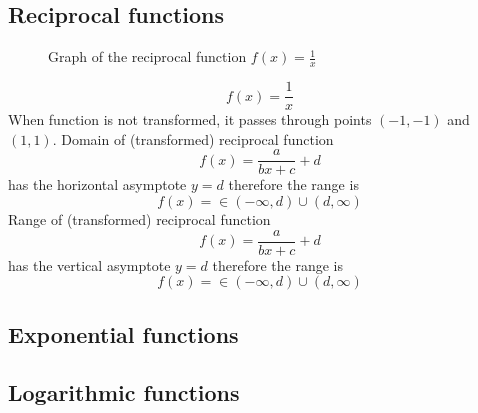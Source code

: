 \documentclass{article}
\begin{document}
\subsection{Reciprocal functions}

\begin{figure}
\centering
{}
\caption{Graph of the reciprocal function $f(x) = \frac{1}{x}$}
\end{figure}


\begin{equation}
  f(x) = \frac{1}{x}
\end{equation}
When function is not transformed, it passes through points $(-1, -1)$ and $(1, 1)$.
Domain of (transformed) reciprocal function
\begin{equation}
f(x) = \frac{a}{bx+c} + d
\end{equation}
has the horizontal asymptote $y = d$ therefore the range is
\begin{equation}
f(x) = \in (-\infty, d) \cup (d, \infty)
\end{equation}
Range of (transformed) reciprocal function
\begin{equation}
f(x) = \frac{a}{bx+c} + d
\end{equation}
has the vertical asymptote $y = d$ therefore the range is
\begin{equation}
f(x) = \in (-\infty, d) \cup (d, \infty)
\end{equation}


\subsection{Exponential functions}
\subsection{Logarithmic functions}
\end{document}

